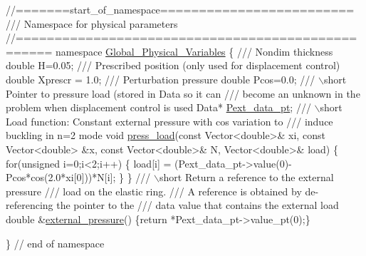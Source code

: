  
\begin{DoxyCodeInclude}
\textcolor{comment}{//=======start\_of\_namespace=========================}
\textcolor{comment}{/// Namespace for physical parameters}
\textcolor{comment}{}\textcolor{comment}{//==================================================}
\textcolor{keyword}{namespace }\hyperlink{namespaceGlobal__Physical__Variables}{Global\_Physical\_Variables}
\{
\textcolor{comment}{}
\textcolor{comment}{ /// Nondim thickness }
\textcolor{comment}{} \textcolor{keywordtype}{double} H=0.05;
 \textcolor{comment}{}
\textcolor{comment}{ /// Prescribed position (only used for displacement control)}
\textcolor{comment}{} \textcolor{keywordtype}{double} Xprescr = 1.0;
\textcolor{comment}{}
\textcolor{comment}{ /// Perturbation pressure}
\textcolor{comment}{} \textcolor{keywordtype}{double} Pcos=0.0;
\textcolor{comment}{}
\textcolor{comment}{ /// \(\backslash\)short Pointer to pressure load (stored in Data so it can }
\textcolor{comment}{ /// become an unknown in the problem when displacement control is used}
\textcolor{comment}{} Data* \hyperlink{namespaceGlobal__Physical__Variables_a9d598320fb3d7ecf94101088e8f376d2}{Pext\_data\_pt};
\textcolor{comment}{}
\textcolor{comment}{ /// \(\backslash\)short Load function: Constant external pressure with cos variation to}
\textcolor{comment}{ /// induce buckling in n=2 mode}
\textcolor{comment}{} \textcolor{keywordtype}{void} \hyperlink{namespaceGlobal__Physical__Variables_a86fd8f502cb8c4c7939ffae742f023eb}{press\_load}(\textcolor{keyword}{const} Vector<double>& xi,
                 \textcolor{keyword}{const} Vector<double> &x,
                 \textcolor{keyword}{const} Vector<double>& N,
                 Vector<double>& load)
 \{
  \textcolor{keywordflow}{for}(\textcolor{keywordtype}{unsigned} i=0;i<2;i++) 
   \{
    load[i] = (Pext\_data\_pt->value(0)-Pcos*cos(2.0*xi[0]))*N[i];
   \}
 \}
 \textcolor{comment}{}
\textcolor{comment}{ /// \(\backslash\)short Return a reference to the external pressure }
\textcolor{comment}{ /// load on the elastic ring.}
\textcolor{comment}{ /// A reference is obtained by de-referencing the pointer to the}
\textcolor{comment}{ /// data value that contains the external load}
\textcolor{comment}{} \textcolor{keywordtype}{double} &\hyperlink{namespaceGlobal__Physical__Variables_a8c25ac6a672ea50d1b709292d1f4837b}{external\_pressure}() 
  \{\textcolor{keywordflow}{return} *Pext\_data\_pt->value\_pt(0);\}


\} \textcolor{comment}{// end of namespace}

\end{DoxyCodeInclude}




